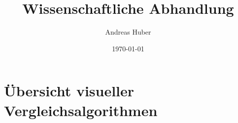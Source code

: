 \documentclass[a4paper,12pt]{article}
\title{Wissenschaftliche Abhandlung}
\author{Andreas Huber}
\date{\today}
\begin{document}

\newpage


\tableofcontents

\newpage


\newpage
{}



\newpage
\section{Übersicht visueller Vergleichsalgorithmen}
















\newpage


\newpage


% 
\end{document}
